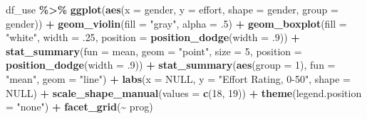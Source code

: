 \documentclass[
]{article}
\newenvironment{Shaded}{\begin{snugshade}}{\end{snugshade}}
\newcommand{\AttributeTok}[1]{\textcolor[rgb]{0.13,0.29,0.53}{#1}}
\newcommand{\ConstantTok}[1]{\textcolor[rgb]{0.56,0.35,0.01}{#1}}
\newcommand{\DecValTok}[1]{\textcolor[rgb]{0.00,0.00,0.81}{#1}}
\newcommand{\FunctionTok}[1]{\textcolor[rgb]{0.13,0.29,0.53}{\textbf{#1}}}
\newcommand{\NormalTok}[1]{#1}
\newcommand{\SpecialCharTok}[1]{\textcolor[rgb]{0.81,0.36,0.00}{\textbf{#1}}}
\newcommand{\StringTok}[1]{\textcolor[rgb]{0.31,0.60,0.02}{#1}}
\begin{document}
\begin{Shaded}
\begin{Highlighting}[]
\NormalTok{df\_use }\SpecialCharTok{\%\textgreater{}\%} 
  \FunctionTok{ggplot}\NormalTok{(}\FunctionTok{aes}\NormalTok{(}\AttributeTok{x =}\NormalTok{ gender,}
             \AttributeTok{y =}\NormalTok{ effort,}
             \AttributeTok{shape =}\NormalTok{ gender,}
             \AttributeTok{group =}\NormalTok{ gender)) }\SpecialCharTok{+} 
  \FunctionTok{geom\_violin}\NormalTok{(}\AttributeTok{fill =} \StringTok{"gray"}\NormalTok{,}
              \AttributeTok{alpha =}\NormalTok{ .}\DecValTok{5}\NormalTok{) }\SpecialCharTok{+}
  \FunctionTok{geom\_boxplot}\NormalTok{(}\AttributeTok{fill =} \StringTok{"white"}\NormalTok{,}
               \AttributeTok{width =}\NormalTok{ .}\DecValTok{25}\NormalTok{,}
               \AttributeTok{position =} \FunctionTok{position\_dodge}\NormalTok{(}\AttributeTok{width =}\NormalTok{ .}\DecValTok{9}\NormalTok{)) }\SpecialCharTok{+}
  \FunctionTok{stat\_summary}\NormalTok{(}\AttributeTok{fun =}\NormalTok{ mean,}
               \AttributeTok{geom =} \StringTok{"point"}\NormalTok{,}
               \AttributeTok{size =} \DecValTok{5}\NormalTok{,}
               \AttributeTok{position =} \FunctionTok{position\_dodge}\NormalTok{(}\AttributeTok{width =}\NormalTok{ .}\DecValTok{9}\NormalTok{)) }\SpecialCharTok{+}
  \FunctionTok{stat\_summary}\NormalTok{(}\FunctionTok{aes}\NormalTok{(}\AttributeTok{group =} \DecValTok{1}\NormalTok{),}
               \AttributeTok{fun =} \StringTok{"mean"}\NormalTok{,}
               \AttributeTok{geom =} \StringTok{"line"}\NormalTok{) }\SpecialCharTok{+}
  \FunctionTok{labs}\NormalTok{(}\AttributeTok{x =} \ConstantTok{NULL}\NormalTok{,}
       \AttributeTok{y =} \StringTok{"Effort Rating, 0{-}50"}\NormalTok{,}
       \AttributeTok{shape =} \ConstantTok{NULL}\NormalTok{)  }\SpecialCharTok{+}
  \FunctionTok{scale\_shape\_manual}\NormalTok{(}\AttributeTok{values =} \FunctionTok{c}\NormalTok{(}\DecValTok{18}\NormalTok{, }\DecValTok{19}\NormalTok{)) }\SpecialCharTok{+}
  \FunctionTok{theme}\NormalTok{(}\AttributeTok{legend.position =} \StringTok{"none"}\NormalTok{) }\SpecialCharTok{+}
  \FunctionTok{facet\_grid}\NormalTok{(}\SpecialCharTok{\textasciitilde{}}\NormalTok{ prog)}
\end{Highlighting}
\end{Shaded}
\end{document}
